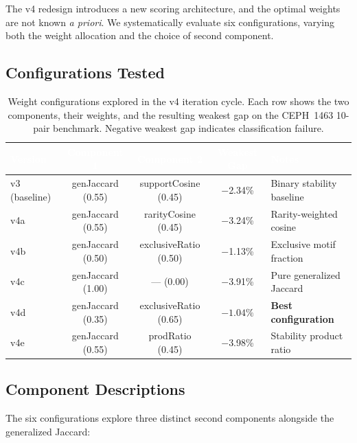 \documentclass{../yalumba}
\begin{document}
The v4 redesign introduces a new scoring architecture, and the optimal weights
are not known \emph{a priori}.  We systematically evaluate six configurations,
varying both the weight allocation and the choice of second component.

\subsection{Configurations Tested}

\begin{table}[H]
  \centering
  \tablestyle
  \caption{Weight configurations explored in the v4 iteration cycle.  Each row
    shows the two components, their weights, and the resulting weakest gap on
    the CEPH~1463 10-pair benchmark.  Negative weakest gap indicates
    classification failure.}
  \label{tab:weight-search}
  \begin{tabular}{lcccl}
    \toprule
    \rowcolor{table-header}
    \textcolor{white}{\textbf{Version}} &
    \textcolor{white}{\textbf{Component 1}} &
    \textcolor{white}{\textbf{Component 2}} &
    \textcolor{white}{\textbf{Weakest Gap}} &
    \textcolor{white}{\textbf{Notes}} \\
    \midrule
    v3 (baseline) & genJaccard (0.55) & supportCosine (0.45)
      & $-$2.34\% & Binary stability baseline \\
    v4a & genJaccard (0.55) & rarityCosine (0.45)
      & $-$3.24\% & Rarity-weighted cosine \\
    v4b & genJaccard (0.50) & exclusiveRatio (0.50)
      & $-$1.13\% & Exclusive motif fraction \\
    v4c & genJaccard (1.00) & --- (0.00)
      & $-$3.91\% & Pure generalized Jaccard \\
    v4d & genJaccard (0.35) & exclusiveRatio (0.65)
      & $\mathbf{-1.04\%}$ & \textbf{Best configuration} \\
    v4e & genJaccard (0.55) & prodRatio (0.45)
      & $-$3.98\% & Stability product ratio \\
    \bottomrule
  \end{tabular}
\end{table}

\subsection{Component Descriptions}

The six configurations explore three distinct second components alongside the
generalized Jaccard:
\end{document}

